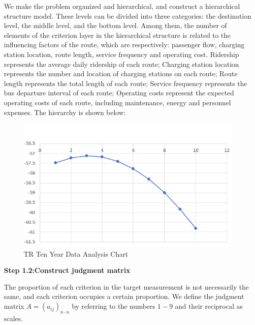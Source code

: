 \documentclass[12pt]{article}
\begin{document}
We make the problem organized and hierarchical, and construct a hierarchical structure model. These levels can be divided into 
three categories: the destination level, the middle level, and the bottom level. Among them, the number of elements of the criterion 
layer in the hierarchical structure is related to the influencing factors of the route, which are respectively: passenger flow, 
charging station location, route length, service frequency and operating cost. Ridership represents the average daily ridership of 
each route; Charging station location represents the number and location of charging stations on each route; Route length represents 
the total length of each route; Service frequency represents the bus departure interval of each route; Operating costs represent the 
expected operating costs of each route, including maintenance, energy and personnel expenses. The hierarchy is shown below:
\begin{figure}[H]
	\centering
	\includegraphics[scale=0.7]{data.png}%
	\caption{TR Ten Year Data Analysis Chart} %
\end{figure}

\textbf{Step 1.2:Construct judgment matrix}

The proportion of each criterion in the target measurement is not necessarily the same, and each criterion occupies a certain 
proportion. We define the judgment matrix $A= (a_{ij}) _{n \cdot n}$ by referring to the numbers $1-9$ and their reciprocal as scales.
\end{document}
